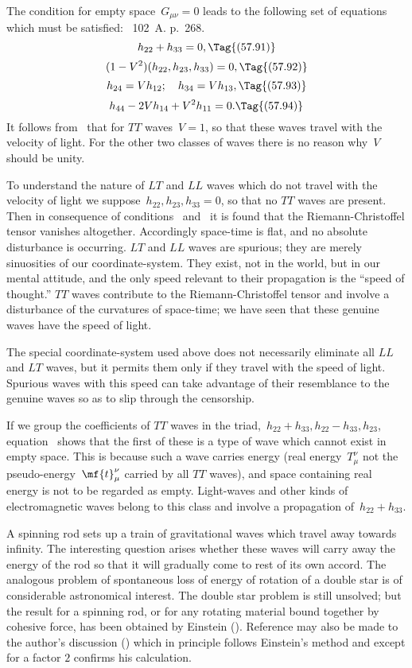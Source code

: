 \documentclass[12pt]{book}
\begin{document}
The condition for empty space~$G_{\mu\nu} = 0$ leads to the following set of equations which must be
satisfied\footnotemark:\footnotetext
      {\ 102~A. p.~268.}
\[
h_{22} + h_{33} = 0,\Tag{(57.91)}
\]
\[
(1-V^2)(h_{22}, h_{23}, h_{33}) = 0,\Tag{(57.92)}
\]
\[
h_{24} = V h_{12}; \quad h_{34} = V h_{13},\Tag{(57.93)}
\]
\[
h_{44} - 2 V h_{14} + V^2 h_{11} = 0.\Tag{(57.94)}
\]
It follows from~ that for $TT$ waves~$V=1$, so that these waves travel with the velocity of light.
For the other two classes of waves there is no reason why~$V$ should be unity.

To understand the nature of $LT$ and $LL$ waves which do not travel with the velocity of light we
suppose~$h_{22}, h_{23}, h_{33} = 0$, so that no $TT$ waves are present.
Then in consequence of conditions~ and~ it is found that the Riemann-Christoffel
tensor vanishes altogether.
Accordingly space-time is flat, and no absolute disturbance is occurring.
$LT$ and $LL$ waves are spurious;
they are merely sinuosities of our coordinate-system.
They exist, not in the world, but in our mental attitude, and the only speed relevant to their propagation is
the ``speed of thought.'' $TT$ waves contribute to the Riemann-Christoffel tensor and involve a disturbance of the
curvatures of space-time; we have seen that these genuine waves have the speed of light.

The special coordinate-system used above does not necessarily eliminate all $LL$ and $LT$ waves,
but it permits them only if they travel with the speed of light.
Spurious waves with this speed can take advantage of their resemblance to the genuine waves so as to slip
through the censorship.

If we group the coefficients of $TT$ waves in the triad,~$h_{22}+h_{33},h_{22}-h_{33},h_{23}$, equation~
shows that the first of these is a type of wave which cannot exist in empty space.
This is because such a wave carries energy (real energy~$T^\nu_\mu$ not the pseudo-energy~$\mf{t}^\nu_\mu$
carried by all $TT$ waves), and space containing real energy is not to be regarded as empty.
Light-waves and other kinds of electromagnetic waves belong to this class and involve
a propagation of~$h_{22}+h_{33}$.

A spinning rod sets up a train of gravitational waves which travel away towards infinity.
The interesting question arises whether these waves will carry away the energy of the rod so that it will
gradually come to rest of its own accord.
The analogous problem of spontaneous loss of energy of rotation of a double star is of considerable
astronomical interest.
The double star problem is still unsolved; but the result for a spinning rod, or for any rotating material
bound together by cohesive force, has been obtained by Einstein
().
Reference may also be made to the author's discussion
() which in principle follows Einstein's method and except for a factor $2$
confirms his calculation.
\end{document}
